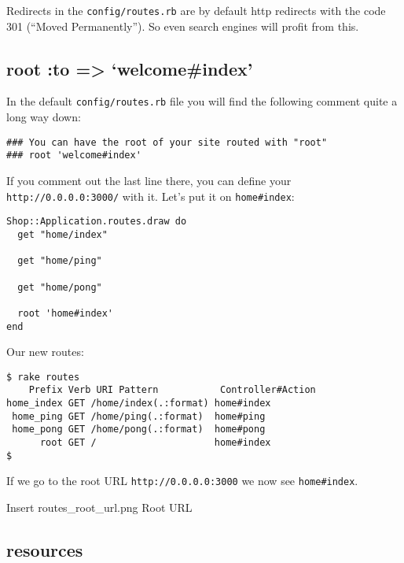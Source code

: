 \documentclass[a4paper]{book}
\begin{document}
Redirects in the \texttt{config/routes.rb} are by default http redirects with the code 301 (“Moved Permanently”). So even search engines will profit from this.

\subsection{root :to =\textgreater{} `welcome\#index'}\label{root-to-welcomeindex}

In the default \texttt{config/routes.rb} file you will find the following comment quite a long way down:

\begin{shaded}\begin{verbatim}
### You can have the root of your site routed with "root"
### root 'welcome#index'
\end{verbatim}\end{shaded}

If you comment out the last line there, you can define your \texttt{http://0.0.0.0:3000/} with it. Let's put it on \texttt{home\#index}:

\begin{shaded}\begin{verbatim}
Shop::Application.routes.draw do
  get "home/index"

  get "home/ping"

  get "home/pong"

  root 'home#index'
end
\end{verbatim}\end{shaded}

Our new routes:

\begin{shaded}\begin{verbatim}
$ rake routes
    Prefix Verb URI Pattern           Controller#Action
home_index GET /home/index(.:format) home#index
 home_ping GET /home/ping(.:format)  home#ping
 home_pong GET /home/pong(.:format)  home#pong
      root GET /                     home#index
$
\end{verbatim}\end{shaded}

If we go to the root URL \texttt{http://0.0.0.0:3000} we now see \texttt{home\#index}.

Insert routes\_root\_url.png Root URL

\subsection{resources}\label{resources}
\end{document}
